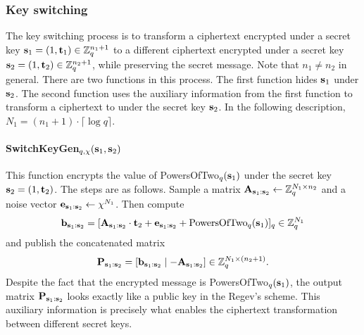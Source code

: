 \documentclass[../main.tex]{subfiles}
\begin{document}
\subsubsection{Key switching} The key switching process is to transform a ciphertext encrypted under a secret key $\mathbf{s}_1=(1,\mathbf{t}_1) \in \mathbb{Z}^{n_1+1}_q$ to a different ciphertext encrypted under a secret key $\mathbf{s}_2=(1,\mathbf{t}_2) \in \mathbb{Z}_q^{n_2+1}$, while preserving the secret message. Note that $n_1 \neq n_2$ in general. There are two functions in this process. The first function hides $\mathbf{s}_1$ under $\mathbf{s}_2$. The second function uses the auxiliary information from the first function to transform a ciphertext to under the secret key $\mathbf{s}_2$. %
In the following description, $N_1 = (n_1+1) \cdot \lceil \log q \rceil$.

\paragraph{SwitchKeyGen$_{q,\chi}(\mathbf{s}_1,\mathbf{s}_2)$} This function %
encrypts the value of PowersOfTwo$_q(\mathbf{s}_1)$ under the secret key $\mathbf{s}_2 = (1,\mathbf{t}_2)$. The steps are as follows. Sample a matrix $\mathbf{A}_{\mathbf{s}_1:\mathbf{s}_2} \leftarrow \mathbb{Z}_q^{N_1 \times n_2}$ and a noise vector $\mathbf{e}_{\mathbf{s}_1:\mathbf{s}_2} \leftarrow \chi^{N_1}$. Then compute 
\begin{align*}
    \mathbf{b}_{\mathbf{s}_1:\mathbf{s}_2} = [\mathbf{A}_{\mathbf{s}_1:\mathbf{s}_2} \cdot \mathbf{t}_2 + \mathbf{e}_{\mathbf{s}_1:\mathbf{s}_2} + \text{PowersOfTwo}_q(\mathbf{s}_1)]_q \in \mathbb{Z}_q^{N_1}
\end{align*}
and publish the concatenated matrix 
\begin{align*}
    \mathbf{P}_{\mathbf{s}_1:\mathbf{s}_2} = [\mathbf{b}_{\mathbf{s}_1:\mathbf{s}_2} \mid -\mathbf{A}_{\mathbf{s}_1:\mathbf{s}_2}] \in \mathbb{Z}_q^{N_1 \times (n_2+1)}.
\end{align*}
Despite the fact that the encrypted message is PowersOfTwo$_q(\mathbf{s}_1)$, the output matrix $\mathbf{P}_{\mathbf{s}_1:\mathbf{s}_2}$ looks exactly like a public key in the Regev's scheme. This auxiliary information is precisely what enables the ciphertext transformation between different secret keys. 
\end{document}
